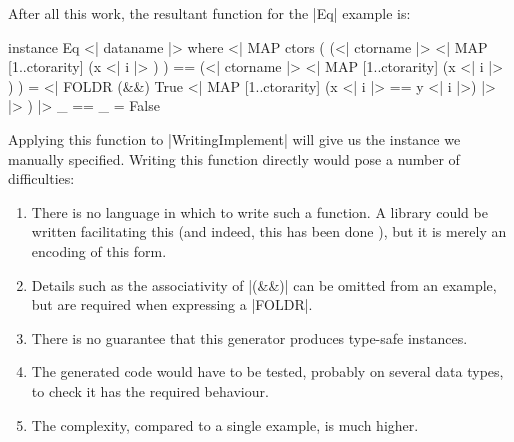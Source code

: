 \documentclass{llncs}
\begin{document}
After all this work, the resultant function for the |Eq| example is:

\begin{code}
instance Eq \? <| dataname |> where
    <| MAP ctors (
        (<| ctorname |> \? <| MAP [1..ctorarity] (x <| i |> ) ) ==
        (<| ctorname |> \? <| MAP [1..ctorarity] (x <| i |> ) ) =
        <| FOLDR (&&) True \? <| MAP [1..ctorarity] (x <| i |> == y <| i |>) |> |>
    ) |>
    _ == _ = False
\end{code}

Applying this function to |WritingImplement| will give us the instance we manually specified. Writing this function directly would pose a number of difficulties:

\begin{enumerate}
\item There is no language in which to write such a function. A library could be written facilitating this (and indeed, this has been done \cite{drift}), but it is merely an encoding of this form.
\item Details such as the associativity of |(&&)| can be omitted from an example, but are required when expressing a |FOLDR|.
\item There is no guarantee that this generator produces type-safe instances.
\item The generated code would have to be tested, probably on several data types, to check it has the required behaviour.
\item The complexity, compared to a single example, is much higher.
\end{enumerate}
\end{document}
